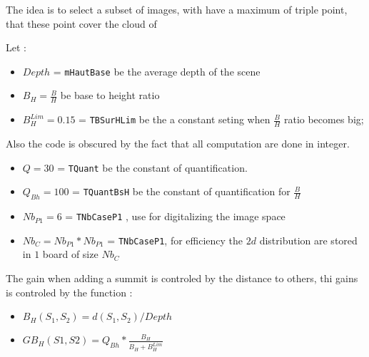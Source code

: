 The idea is to select a subset of images, with have a maximum of triple
point, that these point cover the cloud of 

Let :
\begin{itemize}
    \item  $Depth$ = {\tt mHautBase} be the average depth of the scene
    \item  $B_H = \frac{B}{H} $ be base to height ratio
    \item  $B_H^{Lim} = 0.15 $ = {\tt TBSurHLim} be the a constant seting when $\frac{B}{H}$ 
           ratio becomes big;
\end{itemize}

Also the code is obscured by the fact that all computation are done in
integer.

\begin{itemize}
    \item  $Q=30$ = {\tt TQuant} be the constant of quantification.

    \item  $Q_{Bh}=100$ = {\tt TQuantBsH} be the constant of quantification for $\frac{B}{H} $

    \item $Nb_{P1} = 6 $ = {\tt TNbCaseP1} , use for digitalizing the image space

    \item $Nb_{C} = Nb_{P1} * Nb_{P1} $ = {\tt TNbCaseP1},  for efficiency the $2d$ 
          distribution are stored in $1$ board of size $Nb_C$
    
\end{itemize}


The gain when adding a summit is controled by the distance to others,
thi gains is controled by the function :

\begin{itemize}
    \item $B_H(S_1,S_2)  = d(S_1,S_2) / Depth$  

    \item $GB_H(S1,S2) = Q_{Bh} * \frac{B_H}{B_H + B_H^{Lim}}$ 
\end{itemize}







